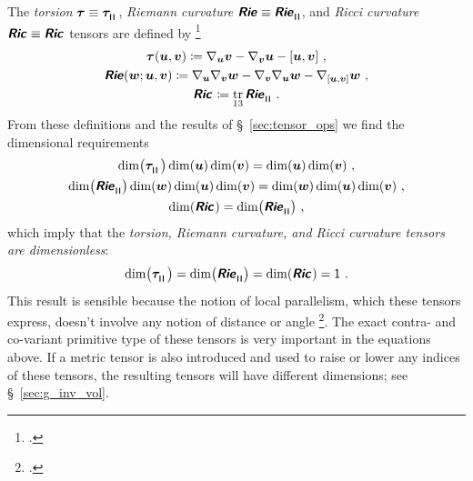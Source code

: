 \documentclass[\ifafour a4paper,12pt,\else a5paper,10pt,\fi%
onecolumn,oneside,article,%
british%
]{memoir}
\makeatletter
\theoremstyle{remark}
\theoremstyle{innote}
\newcommand*{\mathte}[1]{\textbf{\textit{\textsf{#1}}}}
\newcommand*{\citep}{\footcites}
\DeclareMathOperator{\tr}{tr}%
\newcommand*{\defd}{\coloneqq}
\DeclarePairedDelimiter\clcl{[}{]}
\renewcommand*{\|}[1][]{\nonscript\,#1\vert\nonscript\;\mathopen{}}
\newcommand*{\sect}{\S}%
\newcommand*{\cf}{{cf.}}
\newcommand*{\q}{}%
\DeclareRobustCommand*{\q}{%
  \mathord{\mathpalette\bigcdot@{}}%
}
\newcommand*{\bigcdot@scalefactor}{0.7}
\newcommand*{\bigcdot@widthfactor}{1.5}
\newcommand*{\bigcdot@}[2]{%
  \sbox0{$#1\vcenter{}$}%
  \sbox2{$#1\cdot\m@th$}%
  \hbox to \bigcdot@widthfactor\wd2{%
    \hfil
    \raise\ht0\hbox{%
      \scalebox{\bigcdot@scalefactor}{%
        \lower\ht0\hbox{$#1\bullet\m@th$}%
      }%
    }%
    \hfil
  }%
}
\newcommand*{\Un}{\textsf{1}}
\newcommand*{\yR}{\mathte{Rie}}
\newcommand*{\yRi}{\mathte{Ric}}
\newcommand*{\yTo}{\bm{\tau}}
\newcommand*{\yv}{\bm{v}}
\newcommand*{\yu}{\bm{u}}
\newcommand*{\yw}{\bm{w}}
\renewcommand*{\i}{\indices}
\newcommand*{\nab}{\nabla}
\newcommand*{\rul}{{\mkern2mu\rule[-0.1ex]{0.75pt}{1.1ex}\mkern2mu}}
\DeclarePairedDelimiter\mul{\rul}{\rul}%
\makeatother
\begin{document}
\medskip

The \emph{torsion} $\yTo \equiv \yTo\i{^{\q}_{\mul{\q\q}}}$, \emph{Riemann
  curvature} $\yR \equiv \yR\i{^{\q}_{\q\mul{\q\q}}}$, and \emph{Ricci
  curvature} $\yRi \equiv \yRi\i{_{\q\q}}$ tensors are defined by
\citep[\sect~V.B.1]{choquetbruhatetal1977_r1996}
\begin{gather}
  \label{eq:torsion_eq}
\yTo(\yu,\yv) \defd \nab_{\yu}\yv - \nab_{\yv}\yu - \clcl{\yu,\yv}\ ,
\\
\yR(\yw;\yu,\yv) \defd
\nab_{\yu}\nab_{\yv}\yw - \nab_{\yv}\nab_{\yu}\yw
- \nab_{\clcl{\yu,\yv}}\yw\ ,
  \label{eq:riemann_eq}  
\\
\yRi\i{_{\q\q}} \defd \tr_{13} \yR\i{^{\q}_{\q\mul{\q\q}}} \ .
  \label{eq:ricci_eq}  
\end{gather}
From these definitions and the results of \sect~\ref{sec:tensor_ops} we
find the dimensional requirements
\begin{gather}
  \label{eq:torsion_eq_dim}
\dim\bigl(\yTo\i{^{\q}_{\mul{\q\q}}}\bigr)\dim(\yu)\dim(\yv) = \dim(\yu) \dim(\yv)\ ,
\\
\dim\bigl(\yR\i{^{\q}_{\q\mul{\q\q}}}\bigr)\dim(\yw)\dim(\yu)\dim(\yv) =
\dim(\yw)\dim(\yu)\dim(\yv)\ ,
\label{eq:riemann_eq_dim}
\\
\dim(\yRi\i{_{\q\q}}) = \dim\bigl(\yR\i{^{\q}_{\q\mul{\q\q}}}\bigr)\ ,
  \label{eq:ricci_eq_dim}  
\end{gather}
which imply that the \emph{torsion, Riemann curvature, and Ricci curvature
  tensors are dimensionless}:
\begin{equation}
  \label{eq:dim_torsion_riemann_ricci}
  \dim\bigl(\yTo\i{^{\q}_{\mul{\q\q}}}\bigr) =
   \dim\bigl(\yR\i{^{\q}_{\q\mul{\q\q}}}\bigr) =
   \dim(\yRi\i{_{\q\q}}) =\Un\ .
\end{equation}
This result is sensible because the notion of local parallelism, which
these tensors express, doesn't involve any notion of distance or angle
\citep[\cf][]{portamana2011_r2019}. The exact contra- and co-variant
primitive type of these tensors is very important in the equations above.
If a metric tensor is also introduced and used to raise or lower any
indices of these tensors, the resulting tensors will have different
dimensions; see \sect~\ref{sec:g_inv_vol}.
\end{document}
